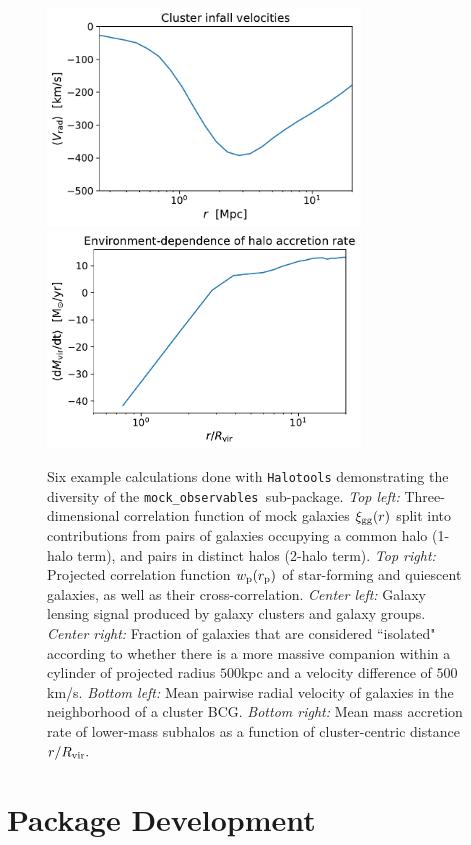 \documentclass[twocolumn, tighten]{aastex6}
\newcommand{\rproj}{r_{\rm p}}
\newcommand{\mockobs}{{\tt mock\_observables }}
\begin{document}
\begin{figure}
\begin{center}
\includegraphics[width=8.3cm]{./FIGS/cluster_infall_velocities.pdf}
\includegraphics[width=8.3cm]{./FIGS/accretion_rate_environment.pdf}
\caption{
Six example calculations done with {\tt Halotools} demonstrating the diversity of the \mockobs sub-package. {\em Top left:} Three-dimensional correlation function of mock galaxies $\xi_{\rm gg}(r)$ split into contributions from pairs of galaxies occupying a common halo (1-halo term), and pairs in distinct halos (2-halo term). {\em Top right:} Projected correlation function $w_{\rm p}(\rproj)$ of star-forming and quiescent galaxies, as well as their cross-correlation. {\em Center left:} Galaxy lensing signal produced by galaxy clusters and galaxy groups. {\em Center right:} Fraction of galaxies that are considered ``isolated" according to whether there is a more massive companion within a cylinder of projected radius $500$kpc and a velocity difference of $500$km/s. {\em Bottom left:} Mean pairwise radial velocity of galaxies in the neighborhood of a cluster BCG. {\em Bottom right:} Mean mass accretion rate of lower-mass subhalos as a function of cluster-centric distance $r/R_{\rm vir}.$
}
\label{fig:mockobs}
\end{center}
\end{figure}

\section{Package Development}
\label{section:development}
\end{document}
